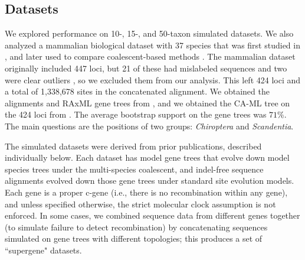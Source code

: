 \subsection{Datasets}

We explored performance on 10-, 15-, and 50-taxon simulated datasets. 
We also analyzed a  mammalian biological dataset  with 37 species that was
first studied in \cite{Song2012}, and later used to compare coalescent-based methods
\cite{mirarab2014astral,SpringerGatesy2016,bayzid2013naive}. 
The mammalian dataset originally included 447 loci, but 21 of these
had mislabeled sequences and two were clear outliers \cite{ASTRAL},
so we excluded them from our analysis. 
This left 424 loci and a total of 1,338,678 sites in the
concatenated alignment.  
We obtained the alignments and RAxML gene trees from \cite{Song2012}, and we obtained the CA-ML tree on the 424 loci from \cite{ASTRAL}.
The average bootstrap support on the gene trees was $71\%$.  The main questions are the
positions of two groups: \emph{Chiroptera} and \emph{Scandentia}.



    



The simulated datasets were derived from prior publications, described
individually below.  Each dataset has model gene trees that evolve
down model species trees under the multi-species coalescent, and
indel-free sequence alignments evolved down those gene trees under
standard site evolution models.  Each gene is a proper c-gene (i.e.,
there is no recombination within any gene), and unless specified
otherwise, the strict molecular clock assumption is not enforced.  
In some cases, we combined sequence data from different genes together (to simulate  failure to detect recombination)  by concatenating sequences
simulated on gene trees with different topologies; this produces a set of ``supergene" datasets.

